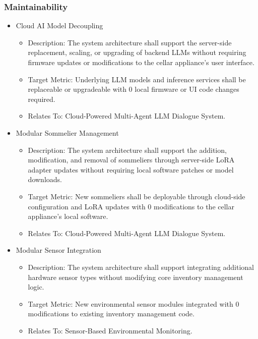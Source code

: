 \documentclass[conference]{IEEEtran}
\begin{document}
\subsubsection{Maintainability}
\begin{itemize}
    \item Cloud AI Model Decoupling
    \begin{itemize}
        \item Description: The system architecture shall support the server-side replacement, scaling, or upgrading of backend LLMs without requiring firmware updates or modifications to the cellar appliance's user interface.
        \item Target Metric: Underlying LLM models and inference services shall be replaceable or upgradeable with 0 local firmware or UI code changes required.
        \item Relates To: Cloud-Powered Multi-Agent LLM Dialogue System.
    \end{itemize}

    \item Modular Sommelier Management
    \begin{itemize}
        \item Description: The system architecture shall support the addition, modification, and removal of sommeliers through server-side LoRA adapter updates without requiring local software patches or model downloads.
        \item Target Metric: New sommeliers shall be deployable through cloud-side configuration and LoRA updates with 0 modifications to the cellar appliance's local software.
        \item Relates To: Cloud-Powered Multi-Agent LLM Dialogue System.
    \end{itemize}

    \item Modular Sensor Integration
    \begin{itemize}
        \item Description: The system architecture shall support integrating additional hardware sensor types without modifying core inventory management logic.
        \item Target Metric: New environmental sensor modules integrated with 0 modifications to existing inventory management code.
        \item Relates To: Sensor-Based Environmental Monitoring.
    \end{itemize}
\end{itemize}
\end{document}
